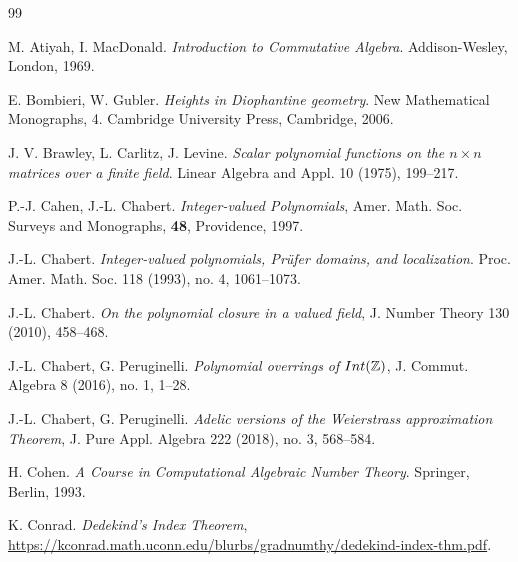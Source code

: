 \documentclass{article}
\theoremstyle{definition}\newtheorem{Def}[equation]{Definition}
\theoremstyle{definition}\newtheorem{Ques}[equation]{Question}
\theoremstyle{definition}\newtheorem{Conj}[equation]{Conjecture}
\theoremstyle{definition}\newtheorem{Not}[equation]{Notation}
\newcommand{\Z}{\mathbb{Z}}
\newcommand{\Int}{\textnormal{Int}}
\numberwithin{equation}{section}
\begin{document}
\begin{thebibliography}{99}



 M. Atiyah, I. MacDonald. \emph{Introduction to Commutative Algebra}. Addison-Wesley, London, 1969.

 E. Bombieri, W. Gubler. \emph{Heights in Diophantine geometry}. New Mathematical Monographs, 4. Cambridge University Press, Cambridge, 2006.

 J. V. Brawley, L. Carlitz, J. Levine. \emph{Scalar polynomial functions on the $n \times n$ matrices over a finite field}. Linear Algebra and Appl. 10 (1975), 199--217.


 P.-J. Cahen, J.-L. Chabert. \emph{Integer-valued Polynomials}, Amer. Math. Soc. Surveys and Monographs, {\bf 48}, Providence, 1997.

 J.-L. Chabert. \emph{Integer-valued polynomials, Pr\"ufer domains, and localization}. Proc. Amer. Math. Soc. 118 (1993), no. 4, 1061--1073. 

 J.-L. Chabert. \emph{On the polynomial closure in a valued field}, J. Number Theory 130 (2010), 458--468.




 J.-L. Chabert, G. Peruginelli. \emph{Polynomial overrings of $\Int(\Z)$}, J. Commut. Algebra 8 (2016), no. 1, 1--28.

 J.-L. Chabert, G. Peruginelli. \emph{Adelic versions of the Weierstrass approximation Theorem}, J. Pure Appl. Algebra 222 (2018), no. 3, 568--584.

 H. Cohen. \emph{A Course in Computational Algebraic Number Theory}. Springer, Berlin, 1993.

 K. Conrad. \emph{Dedekind's Index Theorem},\\ \href{https://kconrad.math.uconn.edu/blurbs/gradnumthy/dedekind-index-thm.pdf}{https://kconrad.math.uconn.edu/blurbs/gradnumthy/dedekind-index-thm.pdf}.



\end{thebibliography}
\end{document}
